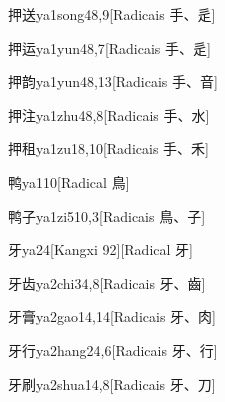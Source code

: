 \begin{entry}{押送}{ya1song4}{8,9}[Radicais ⼿、⾡]
\end{entry}

\begin{entry}{押运}{ya1yun4}{8,7}[Radicais ⼿、⾡]
\end{entry}

\begin{entry}{押韵}{ya1yun4}{8,13}[Radicais ⼿、⾳]
\end{entry}

\begin{entry}{押注}{ya1zhu4}{8,8}[Radicais ⼿、⽔]
\end{entry}

\begin{entry}{押租}{ya1zu1}{8,10}[Radicais ⼿、⽲]
\end{entry}

\begin{entry}{鸭}{ya1}{10}[Radical ⿃]
\end{entry}

\begin{entry}{鸭子}{ya1zi5}{10,3}[Radicais ⿃、⼦]
\end{entry}

\begin{entry}{牙}{ya2}{4}[Kangxi 92][Radical ⽛]
\end{entry}

\begin{entry}{牙齿}{ya2chi3}{4,8}[Radicais ⽛、⿒]
\end{entry}

\begin{entry}{牙膏}{ya2gao1}{4,14}[Radicais ⽛、⾁]
\end{entry}

\begin{entry}{牙行}{ya2hang2}{4,6}[Radicais ⽛、⾏]
\end{entry}

\begin{entry}{牙刷}{ya2shua1}{4,8}[Radicais ⽛、⼑]
\end{entry}

